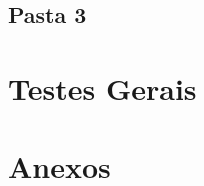 \documentclass[11pt]{article}
\begin{document}
	\pagebreak
	
	\large
	\subsection{Pasta 3}
	\normalsize
	
	
	\large
	\section{Testes Gerais}
	\normalsize

	\large
	\section{Anexos}

	\normalsize
	\listoffigures
\end{document}
